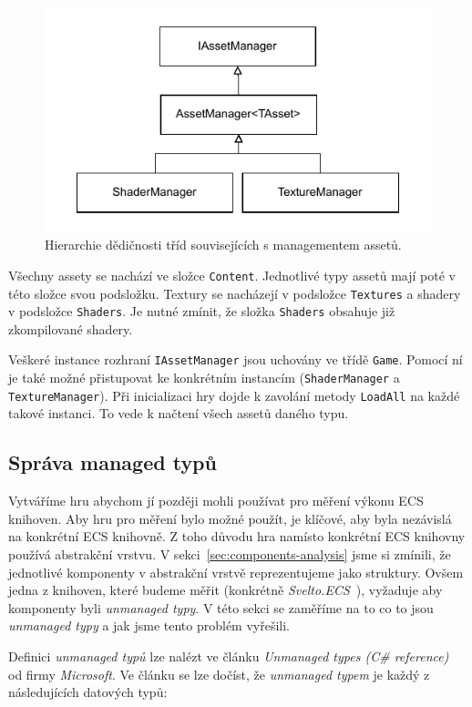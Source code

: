 \begin{figure}[!htb]
  \centering
  \includegraphics[width=0.6\linewidth]{img/asset-manager.pdf}
  \caption{Hierarchie dědičnosti tříd souvisejících s managementem assetů.}
  \label{fig:asset-manager}
\end{figure}

Všechny assety se nachází ve složce \texttt{Content}. Jednotlivé typy assetů mají poté v této složce svou podsložku. Textury se nacházejí v podsložce \texttt{Textures} a shadery v podsložce \texttt{Shaders}. Je nutné zmínit, že složka \texttt{Shaders} obsahuje již zkompilované shadery.

Veškeré instance rozhraní \texttt{IAssetManager} jsou uchovány ve třídě \texttt{Game}. Pomocí ní je také možné přistupovat ke konkrétním instancím (\texttt{ShaderManager} a \texttt{TextureManager}). Při inicializaci hry dojde k zavolání metody \texttt{LoadAll} na každé takové instanci. To vede k načtení všech assetů daného typu.

\subsection{Správa managed typů}
Vytváříme hru abychom jí později mohli používat pro měření výkonu ECS knihoven. Aby hru pro měření bylo možné použít, je klíčové, aby byla nezávislá na konkrétní ECS knihovně. Z toho důvodu hra namísto konkrétní ECS knihovny používá abstrakční vrstvu. V sekci~\ref{sec:components-analysis} jsme si zmínili, že jednotlivé komponenty v abstrakční vrstvě reprezentujeme jako struktury. Ovšem jedna z knihoven, které budeme měřit (konkrétně \textit{Svelto.ECS}~\cite{SveltoECS}), vyžaduje aby komponenty byli \textit{unmanaged typy}. V této sekci se zaměříme na to co to jsou \textit{unmanaged typy} a jak jsme tento problém vyřešili.

Definici \textit{unmanaged typů} lze nalézt ve článku \textit{Unmanaged types (C\# reference)}~\cite{Unmanagedtypes} od firmy \textit{Microsoft}. Ve článku se lze dočíst, že \textit{unmanaged typem} je každý z následujících datových typů:

